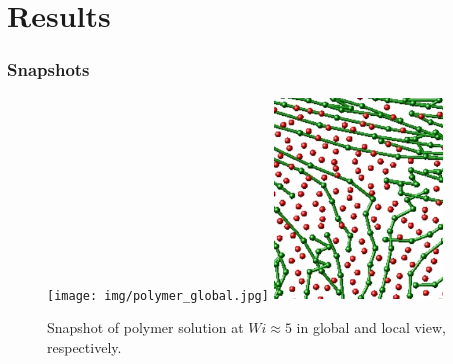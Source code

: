 \section{Results}


\begin{frame}
  \frametitle{Snapshots}
 \begin{figure}
    \centering
    \texttt{[image: img/polymer\_global.jpg]}
    \includegraphics[width=0.4\textwidth]{img/polymer_local_3}
    \caption{Snapshot of polymer solution at $Wi\approx5$ in global and local view, respectively.}
    \label{fig:vor_sol}
  \end{figure}
\end{frame}

